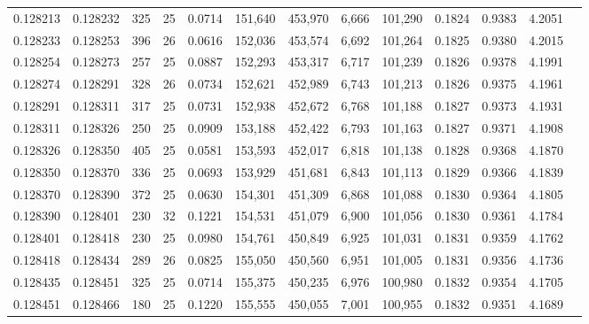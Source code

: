 \begin{tabular}{rrrrrrrrrrrrr}
0.128213 & 0.128232 &   325 &  25 &                                     0.0714 & 151,640 & 453,970 &   6,666 & 101,290 & 0.1824 & 0.9383 & 4.2051 \\
0.128233 & 0.128253 &   396 &  26 &                                     0.0616 & 152,036 & 453,574 &   6,692 & 101,264 & 0.1825 & 0.9380 & 4.2015 \\
0.128254 & 0.128273 &   257 &  25 &                                     0.0887 & 152,293 & 453,317 &   6,717 & 101,239 & 0.1826 & 0.9378 & 4.1991 \\
0.128274 & 0.128291 &   328 &  26 &                                     0.0734 & 152,621 & 452,989 &   6,743 & 101,213 & 0.1826 & 0.9375 & 4.1961 \\
0.128291 & 0.128311 &   317 &  25 &                                     0.0731 & 152,938 & 452,672 &   6,768 & 101,188 & 0.1827 & 0.9373 & 4.1931 \\
0.128311 & 0.128326 &   250 &  25 &                                     0.0909 & 153,188 & 452,422 &   6,793 & 101,163 & 0.1827 & 0.9371 & 4.1908 \\
0.128326 & 0.128350 &   405 &  25 &                                     0.0581 & 153,593 & 452,017 &   6,818 & 101,138 & 0.1828 & 0.9368 & 4.1870 \\
0.128350 & 0.128370 &   336 &  25 &                                     0.0693 & 153,929 & 451,681 &   6,843 & 101,113 & 0.1829 & 0.9366 & 4.1839 \\
0.128370 & 0.128390 &   372 &  25 &                                     0.0630 & 154,301 & 451,309 &   6,868 & 101,088 & 0.1830 & 0.9364 & 4.1805 \\
0.128390 & 0.128401 &   230 &  32 &                                     0.1221 & 154,531 & 451,079 &   6,900 & 101,056 & 0.1830 & 0.9361 & 4.1784 \\
0.128401 & 0.128418 &   230 &  25 &                                     0.0980 & 154,761 & 450,849 &   6,925 & 101,031 & 0.1831 & 0.9359 & 4.1762 \\
0.128418 & 0.128434 &   289 &  26 &                                     0.0825 & 155,050 & 450,560 &   6,951 & 101,005 & 0.1831 & 0.9356 & 4.1736 \\
0.128435 & 0.128451 &   325 &  25 &                                     0.0714 & 155,375 & 450,235 &   6,976 & 100,980 & 0.1832 & 0.9354 & 4.1705 \\
0.128451 & 0.128466 &   180 &  25 &                                     0.1220 & 155,555 & 450,055 &   7,001 & 100,955 & 0.1832 & 0.9351 & 4.1689 \\

\end{tabular}
